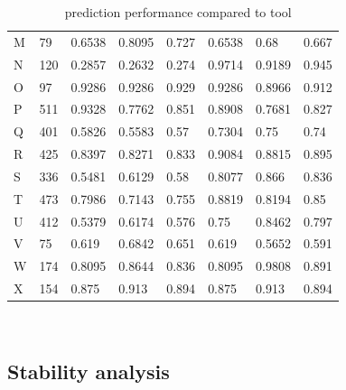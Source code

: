\documentclass[11pt]{article} %
\begin{document}
\begin{table}[H]
{\begin{adjustbox}{max width=\textwidth,max totalheight=\textheight,keepaspectratio}
\begin{tabular}{llllHllH}
				M     & 79     & 0.6538      & 0.8095 & 0.727              & 0.6538      & 0.68   & 0.667              \\
				N     & 120    & 0.2857      & 0.2632 & 0.274              & 0.9714      & 0.9189 & 0.945              \\
				O     & 97     & 0.9286      & 0.9286 & 0.929              & 0.9286      & 0.8966 & 0.912              \\
				P     & 511    & 0.9328      & 0.7762 & 0.851              & 0.8908      & 0.7681 & 0.827              \\
				Q     & 401    & 0.5826      & 0.5583 & 0.57               & 0.7304      & 0.75   & 0.74               \\
				R     & 425    & 0.8397      & 0.8271 & 0.833              & 0.9084      & 0.8815 & 0.895              \\
				S     & 336    & 0.5481      & 0.6129 & 0.58               & 0.8077      & 0.866  & 0.836              \\
				T     & 473    & 0.7986      & 0.7143 & 0.755              & 0.8819      & 0.8194 & 0.85               \\
				U     & 412    & 0.5379      & 0.6174 & 0.576              & 0.75        & 0.8462 & 0.797              \\
				V     & 75     & 0.619       & 0.6842 & 0.651              & 0.619       & 0.5652 & 0.591              \\
				W     & 174    & 0.8095      & 0.8644 & 0.836              & 0.8095      & 0.9808 & 0.891              \\
				X     & 154    & 0.875       & 0.913  & 0.894              & 0.875       & 0.913  & 0.894              \\ \bottomrule
			\end{tabular}
		\end{adjustbox}\\}
\caption{\OurTool~ prediction performance compared to  tool}
\end{table}

\subsection{Stability analysis}
\end{document}
